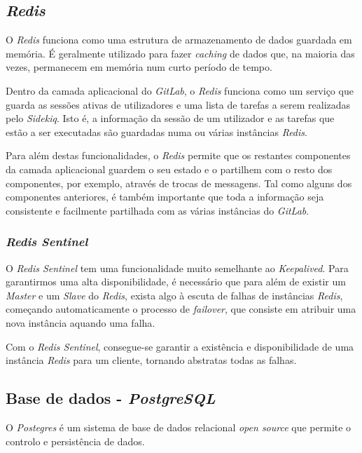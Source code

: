 \documentclass[12pt,a4paper]{article}
\begin{document}
\subsection{\emph{Redis}}
O \emph{Redis} funciona como uma estrutura de armazenamento de dados guardada em memória. É geralmente utilizado para fazer \emph{caching} de dados que, na maioria das vezes, permanecem em memória num curto período de tempo.

Dentro da camada aplicacional do \emph{GitLab}, o \emph{Redis} funciona como um serviço que guarda as sessões ativas de utilizadores e uma lista de tarefas a serem realizadas pelo \emph{Sidekiq}. Isto é, a informação da sessão de um utilizador e as tarefas que estão a ser executadas são guardadas numa ou várias instâncias \emph{Redis}.

Para além destas funcionalidades, o \emph{Redis} permite que os restantes componentes da camada aplicacional guardem o seu estado e o partilhem com o resto dos componentes, por exemplo, através de trocas de messagens. Tal como alguns dos componentes anteriores, é também importante que toda a informação seja consistente e facilmente partilhada com as várias instâncias do \emph{GitLab}.

\subsubsection{\emph{Redis Sentinel}}
O \emph{Redis Sentinel} tem uma funcionalidade muito semelhante ao \emph{Keepalived}. Para garantirmos uma alta disponibilidade, é necessário que para além de existir um \emph{Master} e um \emph{Slave} do \emph{Redis}, exista algo à escuta de falhas de instâncias \emph{Redis}, começando automaticamente o processo de \emph{failover}, que consiste em atribuir uma nova instância aquando uma falha.

Com o \emph{Redis Sentinel}, consegue-se garantir a existência e disponibilidade de uma instância \emph{Redis} para um cliente, tornando abstratas todas as falhas.



\subsection{Base de dados - \emph{PostgreSQL}}
O \emph{Postegres} é um sistema de base de dados relacional \emph{open source} que permite o controlo e  persistência de dados.
\end{document}
